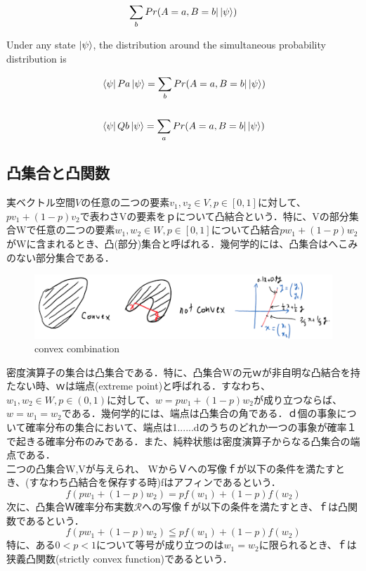 \documentclass[xelatex,ja=standard,jafont=noto]{bxjsarticle}
\begin{document}
\newpage


\begin{equation}
    \sum_{b}Pr(A=a,B=b|\ket{\psi})
\end{equation}

Under any state $\ket{\psi}$, the distribution around the simultaneous probability distribution is

\begin{equation}
    \begin{aligned}
        &\bra{\psi}Pa\ket{\psi}=\sum_{b}Pr(A=a,B=b|\ket{\psi})\\
        \\
        &\bra{\psi}Qb\ket{\psi}=\sum_{a}Pr(A=a,B=b|\ket{\psi})
    \end{aligned}
\end{equation}


\subsection{凸集合と凸関数}
実ベクトル空間$V$の任意の二つの要素$v_{1},v_{2}\in V,p\in [0,1]$に対して、$pv_{1}+(1-p)v_{2}$で表わさVの要素をｐについて凸結合という．特に、Vの部分集合Wで任意の二つの要素$w_{1},w_{2}\in W,p\in [0,1]$について凸結合$pw_{1}+(1-p)w_{2}$がWに含まれるとき、凸(部分)集合と呼ばれる．幾何学的には、凸集合はへこみのない部分集合である．\\

\begin{figure}[h!]
    \centering
    \includegraphics[scale=0.7]{1.png}
    \caption{convex combination}
\end{figure}
密度演算子の集合は凸集合である．特に、凸集合Wの元ｗが非自明な凸結合を持たない時、ｗは端点(extreme point)と呼ばれる．すなわち、$w_{1},w_{2}\in W,p\in(0,1)$に対して、$w=pw_{1}+(1-p)w_{2}$が成り立つならば、$w=w_{1}=w_{2}$である．幾何学的には、端点は凸集合の角である．ｄ個の事象について確率分布の集合において、端点は1......dのうちのどれか一つの事象が確率１で起きる確率分布のみである．また、純粋状態は密度演算子からなる凸集合の端点である．\\

二つの凸集合W,Vが与えられ、 WからＶへの写像ｆが以下の条件を満たすとき、(すなわち凸結合を保存する時)fはアフィンであるという．
\begin{equation}
    f(pw_{1}+(1-p)w_{2})=pf(w_{1})+(1-p)f(w_{2})
\end{equation}
次に、凸集合Ｗ確率分布実数$\mathcal{R}$への写像ｆが以下の条件を満たすとき、ｆは凸関数であるという．
\begin{equation}
    f(pw_{1}+(1-p)w_{2})\leqq pf(w_{1})+(1-p)f(w_{2})
\end{equation}
特に、ある$0<p<1$について等号が成り立つのは$w_{1}=w_{2}$に限られるとき、ｆは狭義凸関数(strictly convex function)であるという．\\
\end{document}
